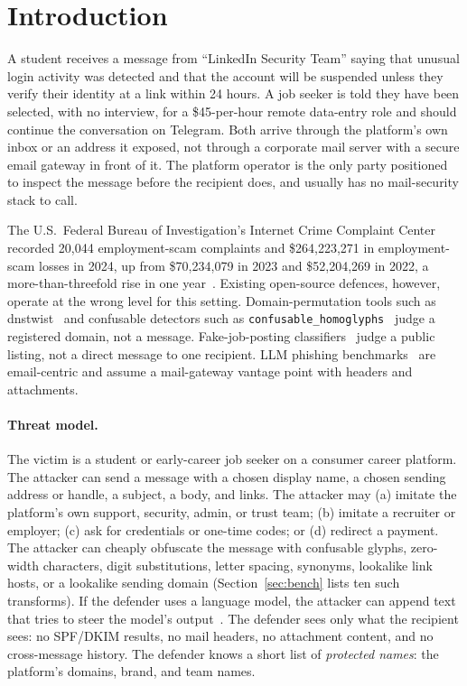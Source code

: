 \documentclass[10pt,twocolumn]{article}
\newcommand{\code}[1]{\texttt{#1}}
\begin{document}
\section{Introduction}
\label{sec:intro}

A student receives a message from ``LinkedIn Security Team'' saying that unusual login activity was detected and that the account will be suspended unless they verify their identity at a link within 24 hours. A job seeker is told they have been selected, with no interview, for a \$45-per-hour remote data-entry role and should continue the conversation on Telegram. Both arrive through the platform's own inbox or an address it exposed, not through a corporate mail server with a secure email gateway in front of it. The platform operator is the only party positioned to inspect the message before the recipient does, and usually has no mail-security stack to call.

The U.S.\ Federal Bureau of Investigation's Internet Crime Complaint Center recorded 20,044 employment-scam complaints and \$264,223,271 in employment-scam losses in 2024, up from \$70,234,079 in 2023 and \$52,204,269 in 2022, a more-than-threefold rise in one year~\cite{ic3_2024}. Existing open-source defences, however, operate at the wrong level for this setting. Domain-permutation tools such as dnstwist~\cite{dnstwist} and confusable detectors such as \code{confusable\_homoglyphs}~\cite{confusablehomoglyphs} judge a registered domain, not a message. Fake-job-posting classifiers~\cite{vidros2017recruitment} judge a public listing, not a direct message to one recipient. LLM phishing benchmarks~\cite{yang2025fraudr1,pajola2025ephishgen} are email-centric and assume a mail-gateway vantage point with headers and attachments.

\paragraph{Threat model.}
The victim is a student or early-career job seeker on a consumer career platform. The attacker can send a message with a chosen display name, a chosen sending address or handle, a subject, a body, and links. The attacker may (a) imitate the platform's own support, security, admin, or trust team; (b) imitate a recruiter or employer; (c) ask for credentials or one-time codes; or (d) redirect a payment. The attacker can cheaply obfuscate the message with confusable glyphs, zero-width characters, digit substitutions, letter spacing, synonyms, lookalike link hosts, or a lookalike sending domain (Section~\ref{sec:bench} lists ten such transforms). If the defender uses a language model, the attacker can append text that tries to steer the model's output~\cite{greshake2023indirect,owasp_llm01}. The defender sees only what the recipient sees: no SPF/DKIM results, no mail headers, no attachment content, and no cross-message history. The defender knows a short list of \emph{protected names}: the platform's domains, brand, and team names.
\end{document}
